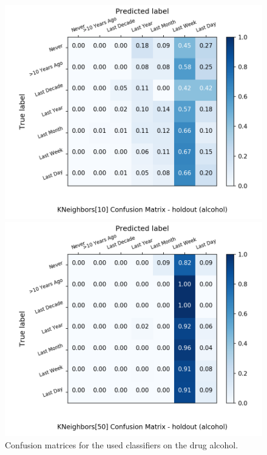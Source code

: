 \documentclass{article}
\begin{document}
\begin{figure}[h!]
\begin{minipage}[b]{0.32\textwidth}
		\includegraphics[width=1.1\textwidth]{Plots/drugs/alcohol_KNeighbors_10_balance_False_holdout.png}
  \end{minipage}
	\begin{minipage}[b]{0.32\textwidth}
		\includegraphics[width=1.1\textwidth]{Plots/drugs/alcohol_KNeighbors_50_balance_False_holdout.png}
  \end{minipage}
	\caption{Confusion matrices for the used classifiers on the drug alcohol.}
	\label{fig:conf_matr_alcohol}
\end{figure}
\end{document}
